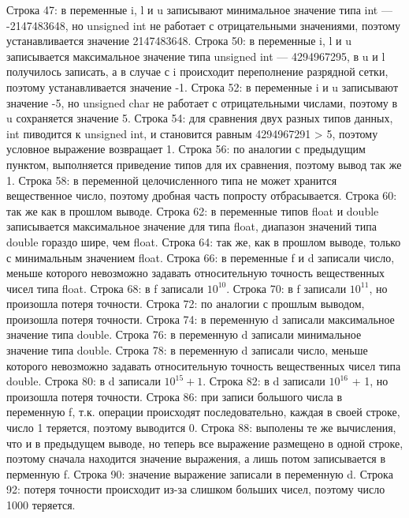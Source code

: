 \documentclass[a4paper,14pt]{extarticle}
\begin{document}
Строка 47: в переменные i, l и u записывают минимальное значение типа int --- -2147483648, но unsigned int не работает с отрицательными значениями, поэтому устанавливается значение 2147483648. 
Строка 50: в переменные  i, l и u записывается максимальное значение типа unsigned int --- 4294967295, в u и l получилось записать, а в случае с i происходит переполнение разрядной сетки, поэтому устанавливается значение -1. 
Строка 52: в переменные i и u записывают значение -5, но unsigned char не работает с отрицательными числами, поэтому в u сохраняется значение 5. 
Строка 54:  для сравнения двух разных типов данных, int пиводится к unsigned int, и становится равным 4294967291 > 5, поэтому условное выражение возвращает 1. 
Строка 56: по аналогии с предыдущим пунктом, выполняется приведение типов для их сравнения, поэтому вывод так же 1. 
Строка 58: в переменной целочисленного типа не может хранится вещественное число, поэтому дробная часть попросту отбрасывается. 
Строка 60: так же как в прошлом выводе. 
Строка 62: в переменные типов float и double записывается максимальное значение для типа float, диапазон значений типа double гораздо шире, чем float. 
Строка 64: так же, как в прошлом выводе, только с минимальным значением float. 
Строка 66: в переменные f и d записали число, меньше которого невозможно задавать относительную точность вещественных чисел типа float. 
Строка 68: в f записали $10^{10}$. 
Строка 70: в f записали $10^{11}$, но произошла потеря точности. 
Строка 72: по аналогии с прошлым выводом, произошла потеря точности. 
Строка 74: в переменную d записали максимальное значение типа double. 
Строка 76: в переменную d записали минимальное значение типа double. 
Строка 78: в переменную d записали число, меньше которого невозможно задавать относительную точность вещественных чисел типа double. 
Строка 80: в d записали $10^{15}+1$. 
Строка 82: в d записали $10^{16}$ + 1, но произошла потеря точности. 
Строка 86: при записи большого числа в переменную f, т.к. операции происходят последовательно, каждая в своей строке, число 1 теряется, поэтому выводится 0. 
Строка 88: выполены те же вычисления, что и в предыдущем выводе, но теперь все выражение размещено в одной строке, поэтому сначала находится значение выражения, а лишь потом записывается в перменную f. 
Строка 90: значение выражение записали в переменную d. 
Строка 92: потеря точности происходит из-за слишком больших чисел, поэтому число 1000 теряется.
\end{document}
